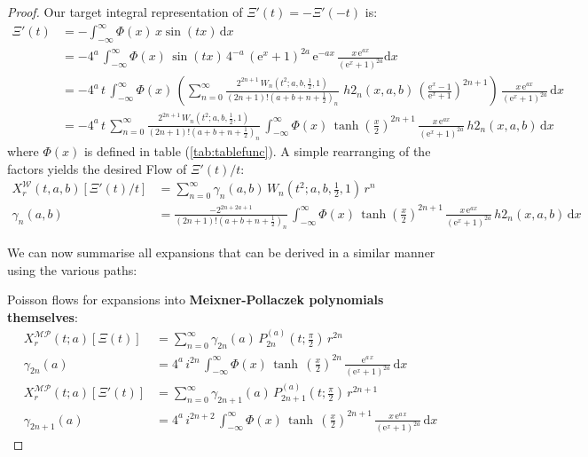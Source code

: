 \documentclass[a4paper,11pt,twoside]{amsart}
\newcommand{\verifiedeq}{=}
\newcommand{\verifiedeq}{\stackrel{\checkmark}{=}}
\begin{document}
\begin{proof}
Our target integral representation of $\Xi'(t) = -\Xi'(-t)$ is:
\begin{align}
 \Xi'(t) &\verifiedeq -\int_{-\infty}^\infty \Phi(x)\,x\sin(tx)\, \mathrm{d}x \\
 &\verifiedeq -4^a\,\int_{-\infty}^\infty \Phi(x)\,\sin(tx)\,4^{-a}\,(\mathrm{e}^x+1)^{2a}\,\mathrm{e}^{-ax} \,\frac{x\,\mathrm{e}^{ax}}{(\mathrm{e}^x+1)^{2a}} \mathrm{d}x \\
 &\verifiedeq -4^a\,t\,\int_{-\infty}^\infty \Phi(x)\,\left(\sum_{n=0}^\infty \frac{2^{2n+1}\,W_n\left(t^2;a,b,\frac12,1\right)}{(2n+1)!\left(a+b+n+\frac12\right)_n}\, \,h2_n(x,a,b)\,\left(\frac{\textrm{e}^{x}-1}{\textrm{e}^{x}+1}\right)^{2n+1}\right)\,\frac{x\,\mathrm{e}^{ax}}{(\mathrm{e}^x+1)^{2a}}\, \mathrm{d}x \\
 &\verifiedeq -4^a\,t\,\sum_{n=0}^\infty \frac{2^{2n+1}\,W_n\left(t^2;a,b,\frac12,1\right)}{(2n+1)!\left(a+b+n+\frac12\right)_n}\,\int_{-\infty}^{\infty} \Phi(x)\,\tanh\left(\frac{x}{2}\right)^{2n+1}\,\frac{x\,\mathrm{e}^{ax}}{(\mathrm{e}^x+1)^{2a}}\,h2_n(x,a,b)\,\mathrm{d}x
\end{align}
where $\Phi(x)$ is defined in table (\ref{tab:tablefunc}). A simple rearranging of the factors yields the desired Flow of $\Xi'(t)/t$:
\begin{align}
X^\mathcal{W}_r(t,a,b)\left[\Xi'(t)/t\right] &\verifiedeq \sum_{n=0}^\infty \gamma_n(a,b)\,W_n\left(t^2;a,b,\frac12,1\right)\,r^n \\
  \gamma_n(a,b) &\verifiedeq \frac{-2^{2n+2a+1}}{(2n+1)!\left(a+b+n+\frac12\right)_n}\,\int_{-\infty}^{\infty} \Phi(x)\,\tanh\left(\frac{x}{2}\right)^{2n+1}\,\frac{x\,\mathrm{e}^{ax}}{(\mathrm{e}^x+1)^{2a}}\,h2_n(x,a,b)\,\mathrm{d}x
\end{align}

We can now summarise all expansions that can be derived in a similar manner using the various paths:

Poisson flows for expansions into \textbf{Meixner-Pollaczek polynomials themselves}:
\begin{align}
X^\mathcal{MP}_r(t;a)\left[\Xi(t)\right] &\verifiedeq \sum_{n=0}^\infty \gamma_{2n}(a)\,P_{2n}^{(a)}\left(t;\frac{\pi}{2}\right)\,r^{2n} \\
\gamma_{2n}(a) &\verifiedeq 4^a\,i^{2n}\,\int_{-\infty}^{\infty} \Phi(x)\,\tanh\,\left(\frac{x}{2}\right)^{2n}\,\frac{\textrm{e}^{a\,x}}{(\textrm{e}^x+1)^{2a}}\,\mathrm{d}x \\
X^\mathcal{MP}_r(t;a)\left[\Xi'(t)\right] &\verifiedeq \sum_{n=0}^\infty \gamma_{2n+1}(a)\,P_{2n+1}^{(a)}\left(t;\frac{\pi}{2}\right)\,r^{2n+1} \\
\gamma_{2n+1}(a) &\verifiedeq 4^a\,i^{2n+2}\,\int_{-\infty}^{\infty} \Phi(x)\,\tanh\,\left(\frac{x}{2}\right)^{2n+1}\,\frac{x\,\textrm{e}^{a\,x}}{(\textrm{e}^x+1)^{2a}}\,\mathrm{d}x
\end{align}


\end{proof}
\end{document}
